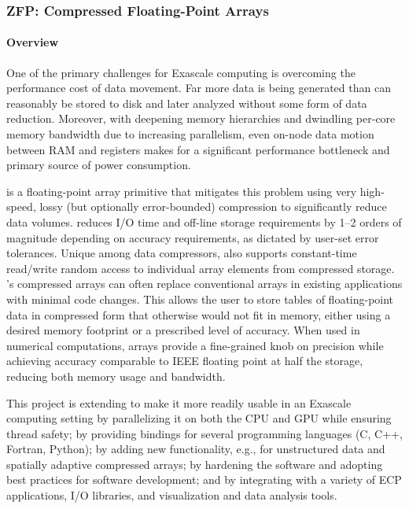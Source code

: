 \newcommand{\zfpmilestone}[1]{~(STDM13-#1)}

\subsubsection{ ZFP: Compressed Floating-Point Arrays}

\paragraph{Overview} 

One of the primary challenges for Exascale computing is overcoming the performance cost of data movement.  
Far more data is being generated than can reasonably be stored to disk and later analyzed without some form of data reduction.  
Moreover, with deepening memory hierarchies and dwindling per-core memory bandwidth due to increasing parallelism, even on-node data motion between RAM and registers makes for a significant performance bottleneck and primary source of power consumption.

{\zfp} is a floating-point array primitive that mitigates this problem using
very high-speed, lossy (but optionally error-bounded) compression to
significantly reduce data volumes.  {\zfp} reduces I/O time and off-line
storage requirements by 1--2 orders of magnitude depending on accuracy
requirements, as dictated by user-set error tolerances.  Unique among data
compressors, {\zfp} also supports constant-time read/write random access to
individual array elements from compressed storage.  {\zfp}'s compressed arrays
can often replace conventional arrays in existing applications with minimal
code changes.  This allows the user to store tables of floating-point
data in compressed form that otherwise would not fit in memory, either using
a desired memory footprint or a prescribed level of accuracy.  When used in
numerical computations, {\zfp} arrays provide a fine-grained knob on precision
while achieving accuracy comparable to IEEE floating point at half the
storage, reducing both memory usage and bandwidth.

This project is extending {\zfp} to make it more readily usable in an Exascale
computing setting by parallelizing it on both the CPU and GPU while ensuring
thread safety; by providing bindings for several programming languages (C,
C++, Fortran, Python); by adding new functionality, e.g., for unstructured
data and spatially adaptive compressed arrays; by hardening the software and
adopting best practices for software development; and by integrating {\zfp}
with a variety of ECP applications, I/O libraries, and visualization and data
analysis tools.


